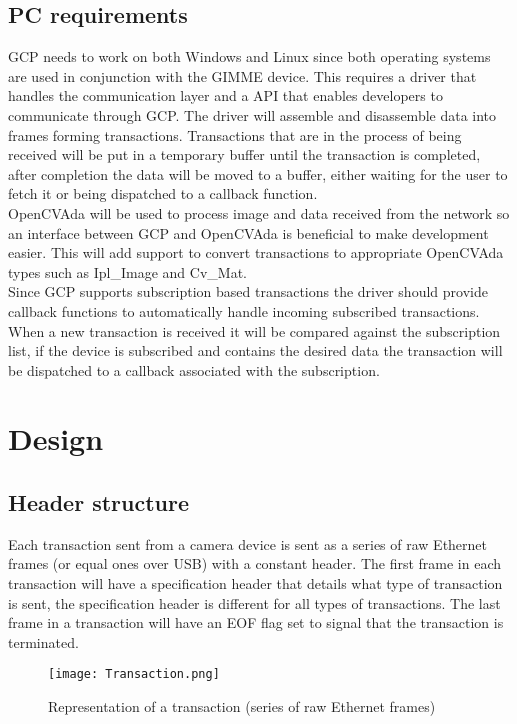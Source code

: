 \subsection{PC requirements}
GCP needs to work on both Windows and Linux since both operating systems are used in conjunction with the GIMME device. This requires a driver that handles the communication layer and a API that enables developers to communicate through GCP. The driver will assemble and disassemble data into frames forming transactions. Transactions that are in the process of being received will be put in a temporary buffer until the transaction is completed, after completion the data will be moved to a buffer, either waiting for the user to fetch it or being dispatched to a callback function.
\\
OpenCVAda will be used to process image and data received from the network so an interface between GCP and OpenCVAda is beneficial to make development easier. This will add support to convert transactions to appropriate OpenCVAda types such as Ipl_Image and Cv_Mat.
\\
Since GCP supports subscription based transactions the driver should provide callback functions to automatically handle incoming subscribed transactions. When a new transaction is received it will be compared against the subscription list, if the device is subscribed and contains the desired data the transaction will be dispatched to a callback associated with the subscription.

\section{Design}
\subsection{Header structure}
Each transaction sent from a camera device is sent as a series of raw Ethernet frames (or equal ones over USB) with a constant header. The first frame in each transaction will have a specification header that details what type of transaction is sent, the specification header is different for all types of transactions. The last frame in a transaction will have an EOF flag set to signal that the transaction is terminated.

\begin{figure}
\centering
\texttt{[image: Transaction.png]}
\caption{Representation of a transaction (series of raw Ethernet frames)}
\label{fig:Transaction}
\end{figure}

